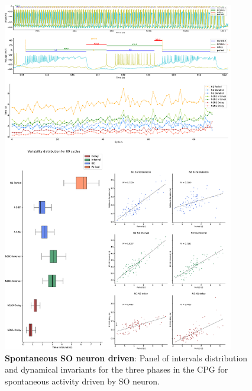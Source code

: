 \begin{figure}[htbp]
	\centering
	\includegraphics[width=0.9\textwidth]{./invariants/data/SUSSEX/prep4_so_driven_2/images/panel_with_intervals.pdf}
	\caption{\textbf{Spontaneous SO neuron driven}: Panel of intervals distribution and dynamical invariants for the three phases in the CPG for spontaneous activity driven by SO neuron.}
	\label{fig:so spontaneous invariants}
\end{figure}

